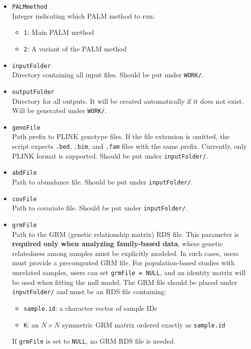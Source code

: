 \documentclass[11pt]{article}
\begin{document}
\begin{itemize}
  \item \texttt{PALMmethod} \\
  Integer indicating which PALM method to run:
  \begin{itemize}
    \item \texttt{1}: Main PALM method
    \item \texttt{2}: A variant of the PALM method
  \end{itemize}

  \item \texttt{inputFolder} \\
  Directory containing all input files. Should be put under \texttt{WORK/}.

  \item \texttt{outputFolder} \\
  Directory for all outputs. It will be created automatically if it does not exist. 
  Will be generated under \texttt{WORK/}.

  \item \texttt{genoFile} \\
  Path prefix to PLINK genotype files. If the file extension is omitted, the script expects
  \texttt{.bed}, \texttt{.bim}, and \texttt{.fam} files with the same prefix.
  Currently, only PLINK format is supported. Should be put under \texttt{inputFolder/}.

  \item \texttt{abdFile} \\
  Path to abundance file. Should be put under \texttt{inputFolder/}.

  \item \texttt{covFile} \\
  Path to covariate file. Should be put under \texttt{inputFolder/}.

  \item \texttt{grmFile} \\
  Path to the GRM (genetic relationship matrix) RDS file.
  This parameter is \textbf{required only when analyzing family-based data}, 
  where genetic relatedness among samples must be explicitly modeled. 
  In such cases, users must provide a precomputed GRM file.
  For population-based studies with unrelated samples, users can set 
  \texttt{grmFile = NULL}, and an identity matrix will be used when fitting 
  the null model.
  The GRM file should be placed under \texttt{inputFolder/} and must be an 
  RDS file containing:
  \begin{itemize}
    \item \texttt{sample.id}: a character vector of sample IDs
    \item \texttt{K}: an $N \times N$ symmetric GRM matrix ordered exactly 
    as \texttt{sample.id}
  \end{itemize}
  If \texttt{grmFile} is set to \texttt{NULL}, no GRM RDS file is needed.

\end{itemize}
\end{document}
